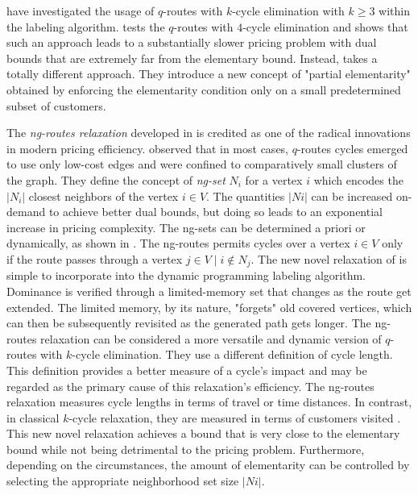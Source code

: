 \textcite{irnich2006, fukasawa2006} have investigated the usage of
$q$-routes with $k$-cycle elimination with $k \ge 3$ within the labeling algorithm.
\textcite{fukasawa2006} tests the $q$-routes with $4$-cycle elimination
and shows that such an approach leads to a substantially slower pricing problem
with dual bounds that are extremely far from the elementary bound.
Instead, \textcite{desaulniers2008} takes a totally different approach.
They introduce a new concept of "partial elementarity"
obtained by enforcing the elementarity condition
only on a small predetermined subset of customers.

The \textit{ng-routes relaxation} developed in \textcite{baldacci2011}
is credited as one of the radical innovations in modern pricing efficiency.
\citeauthor{baldacci2011} observed that in most cases,
$q$-routes cycles emerged to use only low-cost edges
and were confined to comparatively small clusters of the graph.
They define the concept of \textit{ng-set} $N_i$ for a vertex $i$
which encodes the $|N_i|$ closest neighbors of the vertex $i \in V$.
The quantities $|N i|$ can be increased on-demand to achieve better dual bounds,
but doing so leads to an exponential increase in pricing complexity.
The ng-sets can be determined a priori or dynamically, as shown in \textcite{roberti2014}.
The ng-routes permits cycles over a vertex $i \in V$ only if the route
passes through a vertex $j \in V \mid i \notin N_j$.
The new novel relaxation of \citeauthor{baldacci2011}
is simple to incorporate into the dynamic programming labeling algorithm.
Dominance is verified through a limited-memory set
that changes as the route get extended.
The limited memory, by its nature,
"forgets" old covered vertices,
which can then be subsequently revisited
as the generated path gets longer.
The ng-routes relaxation can be considered a more versatile and dynamic version
of $q$-routes with $k$-cycle elimination.
They use a different definition of cycle length.
This definition provides a better measure of a cycle's impact
and may be regarded as the primary cause of this relaxation's efficiency.
The ng-routes relaxation measures cycle lengths in terms of travel or time distances.
In contrast, in classical $k$-cycle relaxation,
they are measured in terms of customers visited \parencite{contardo2014}.
This new novel relaxation achieves a bound that is very close to the elementary bound
while not being detrimental to the pricing problem.
Furthermore, depending on the circumstances,
the amount of elementarity can be controlled by selecting the appropriate
neighborhood set size $|N i|$.

